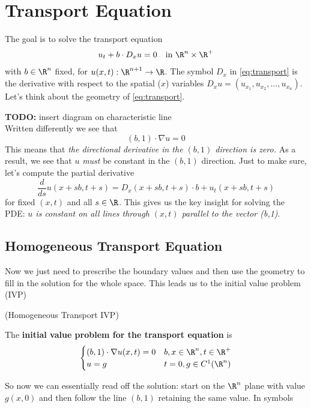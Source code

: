 \documentclass{bkcnotes}
\newcommand{\todo}[1]{{\bf TODO: } #1\\}
\begin{document}
\section{Transport Equation}
The goal is to solve the transport equation
\begin{equation}
  \label{eq:transport}
  \begin{aligned}
    u_t + b \cdot D_xu = 0 && \text{in } \R^n \times \R^+    
  \end{aligned}
\end{equation}
with $b \in \R^n$ fixed, for $u(x,t): \R^{n+1} \to \R$. The symbol
$D_x$ in \eqref{eq:transport} is the derivative with respect to the
spatial ($x$) variables $D_xu =
(u_{x_1},u_{x_2},\ldots,u_{x_n})$. Let's think about the geometry of
\eqref{eq:transport}.

\todo{insert diagram on characteristic line}

Written differently we see that
\begin{equation}
  \label{eq:transport-dot}
  (b,1) \cdot \nabla u = 0
\end{equation}
This means that \emph{the directional derivative in the $(b,1)$
  direction is zero.} As a result, we see that $u$ \emph{must} be
constant in the $(b,1)$ direction. Just to make sure, let's compute the
partial derivative
\begin{equation}
  \label{eq:directional-der}
  \frac{d}{ds} u(x + sb, t+s) = D_x(x+sb,t+s)\cdot b + u_t(x+sb,t+s)
\end{equation}
for fixed $(x,t)$ and all $s \in \R$. This gives us the key insight
for solving the PDE: \emph{$u$ is constant on all lines through
  $(x,t)$ parallel to the vector (b,1)}.

\subsection{Homogeneous Transport Equation}

Now we just need to prescribe the boundary values and then use the
geometry to fill in the solution for the whole space. This leads us to
the initial value problem (IVP)
\vspace{-15px}
\begin{defn}(Homogeneous Transport IVP)

  The \textbf{initial value problem for the transport equation} is
  \begin{equation}
    \label{eq:transport-ivp}
    \begin{cases}
      (b,1) \cdot \nabla u(x,t) = 0 & b,x \in \R^n, t \in \R^+ \\
      u = g & t = 0, g \in C^1(\R^n)
    \end{cases}
  \end{equation}
\end{defn}
So now we can essentially read off the solution: start on the $\R^n$
plane with value $g(x,0)$ and then follow the line $(b,1)$ retaining
the same value. In symbols
\end{document}
